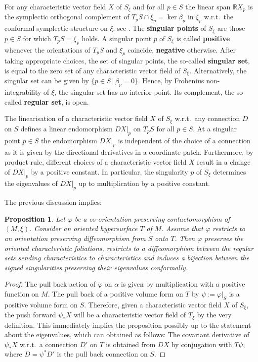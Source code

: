 \documentclass{amsart}
\newtheorem{prop}{Proposition}[subsection]
\theoremstyle{definition}
\newcommand{\R}{\mathbb R}
\begin{document}
For any characteristic vector field $X$ of $S_{\xi}$
and for all $p\in S$ 
the linear span $\R X_p$
is the symplectic orthogonal complement of
$T_pS\cap\xi_p=\ker\beta_p$
in $\xi_p$
w.r.t.\ the conformal symplectic structure on $\xi$,
see \cite[Lemma 2.5.20]{gei08}.
The {\bf singular points} of $S_{\xi}$ are those $p\in S$
for which $T_pS=\xi_p$ holds.
A singular point $p$ of $S_{\xi}$ is called {\bf positive}
whenever the orientations of $T_pS$ and $\xi_p$ coincide,
{\bf negative} otherwise.
After taking appropriate choices,
the set of singular points,
the so-called {\bf singular set},
is equal to the zero set
of any characteristic vector field of $S_{\xi}$.
Alternatively,
the singular set can be given by $\{p\in S\,|\,\beta_p=0\}$.
Hence,
by Frobenius non-integrability of $\xi$,
the singular set has no interior point.
Its complement, the so-called {\bf regular set}, is open.

The linearisation of a characteristic vector field $X$ of $S_{\xi}$
w.r.t.\ any connection $D$ on $S$
defines a linear endomorphism $DX|_p$ on $T_pS$
for all $p\in S$.
At a singular point $p\in S$ the endomorphism $DX|_p$
is independent of the choice of a connection
as it is given by the directional derivatives in a coordinate patch.
Furthermore, by product rule,
different choices of a characteristic vector field $X$
result in a change of $DX|_p$ by a positive constant.
In particular, the singularity $p$ of $S_{\xi}$
determines the eigenvalues of $DX|_p$
up to multiplication by a positive constant.

The previous discussion implies:


\begin{prop}
\label{prop:phiinvonchrfol}
Let $\varphi$ be a co-orientation preserving contactomorphism of $(M,\xi)$.
Consider an oriented hypersurface $T$ of $M$.
Assume that $\varphi$ restricts to an orientation preserving
diffeomorphism from $S$ onto $T$.
Then $\varphi$ preserves the oriented characteristic foliations,
restricts to a diffeomorphism between the regular sets
sending characteristics to characteristics and
induces a bijection between the signed singularities
preserving their eigenvalues conformally.
\end{prop}


\begin{proof}
The pull back action of $\varphi$ on $\alpha$
is given by multiplication with a positive function on $M$.
The pull back of a positive volume form on $T$ by $\psi:=\varphi|_S$
is a positive volume form on $S$.
Therefore,
given a characteristic vector field $X$ of $S_{\xi}$,
the push forward $\psi_*X$
will be a characteristic vector field of $T_{\xi}$ by the very definition.
This immediately implies the proposition
possibly
up to the statement about the eigenvalues,
which can obtained as follows:
The covariant derivative of $\psi_*X$
w.r.t.\ a connection $D'$ on $T$ is obtained from $DX$
by conjugation with $T\psi$,
where $D=\psi^*D'$ is the pull back connection on $S$.
\end{proof}
\end{document}
